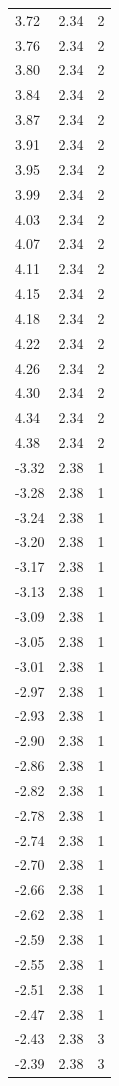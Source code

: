 \begin{longtable}{lrr}
  3.72 & 2.34 & 2 \\
  3.76 & 2.34 & 2 \\
  3.80 & 2.34 & 2 \\
  3.84 & 2.34 & 2 \\
  3.87 & 2.34 & 2 \\
  3.91 & 2.34 & 2 \\
  3.95 & 2.34 & 2 \\
  3.99 & 2.34 & 2 \\
  4.03 & 2.34 & 2 \\
  4.07 & 2.34 & 2 \\
  4.11 & 2.34 & 2 \\
  4.15 & 2.34 & 2 \\
  4.18 & 2.34 & 2 \\
  4.22 & 2.34 & 2 \\
  4.26 & 2.34 & 2 \\
  4.30 & 2.34 & 2 \\
  4.34 & 2.34 & 2 \\
  4.38 & 2.34 & 2 \\
  -3.32 & 2.38 & 1 \\
  -3.28 & 2.38 & 1 \\
  -3.24 & 2.38 & 1 \\
  -3.20 & 2.38 & 1 \\
  -3.17 & 2.38 & 1 \\
  -3.13 & 2.38 & 1 \\
  -3.09 & 2.38 & 1 \\
  -3.05 & 2.38 & 1 \\
  -3.01 & 2.38 & 1 \\
  -2.97 & 2.38 & 1 \\
  -2.93 & 2.38 & 1 \\
  -2.90 & 2.38 & 1 \\
  -2.86 & 2.38 & 1 \\
  -2.82 & 2.38 & 1 \\
  -2.78 & 2.38 & 1 \\
  -2.74 & 2.38 & 1 \\
  -2.70 & 2.38 & 1 \\
  -2.66 & 2.38 & 1 \\
  -2.62 & 2.38 & 1 \\
  -2.59 & 2.38 & 1 \\
  -2.55 & 2.38 & 1 \\
  -2.51 & 2.38 & 1 \\
  -2.47 & 2.38 & 1 \\
  -2.43 & 2.38 & 3 \\
  -2.39 & 2.38 & 3 \\

\end{longtable}
